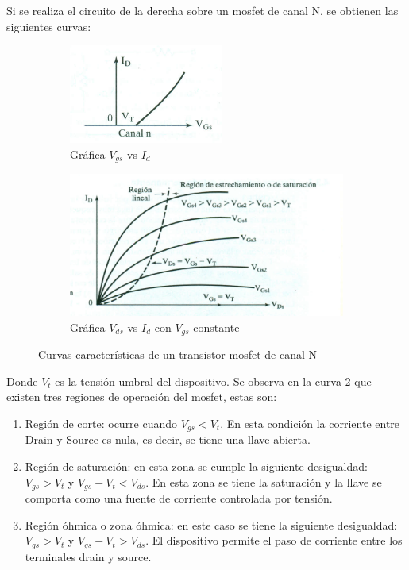 Si se realiza el circuito de la derecha sobre un mosfet de canal N, se obtienen las siguientes curvas:

\begin{figure}[ht]
	\begin{subfigure}{0.5\linewidth}
		\includegraphics[width=\linewidth]{curva_1_mosf}
		\caption{Gráfica $V_{gs}$ vs $ I_d$}
	\end{subfigure}
	\hfil
	\begin{subfigure}{0.5\linewidth}
		\includegraphics[scale=0.75]{curva_2_mosf}
		\caption{Gráfica $V_{ds}$ vs $ I_d$ con $V_{gs}$ constante}
		\label{fig:vds_vs_id_mosfetop}	
	\end{subfigure}
\caption{Curvas características de un transistor mosfet de canal N}
\end{figure}

Donde $V_t$ es la tensión umbral del dispositivo. Se observa en la curva \ref{fig:vds_vs_id_mosfetop} que existen tres regiones de operación del mosfet, estas son:
\begin{enumerate}
	\item Región de corte: ocurre cuando $V_{gs}<V_t$. En esta condición la corriente entre Drain y Source es nula, es decir, se tiene una llave abierta.
	\item  Región de saturación: en esta zona se cumple la siguiente desigualdad: $V_{gs}>V_t$ y $V_{gs}-V_{t}<V_{ds}$. En esta zona se tiene la saturación y la llave se comporta como una fuente de corriente controlada por tensión. 
	\item Región óhmica o zona óhmica: en este caso se tiene la siguiente desigualdad: $V_{gs}>V_t$ y $V_{gs}-V_t>V_{ds}$. El dispositivo permite el paso de corriente entre los terminales drain y source. 
\end{enumerate} 


